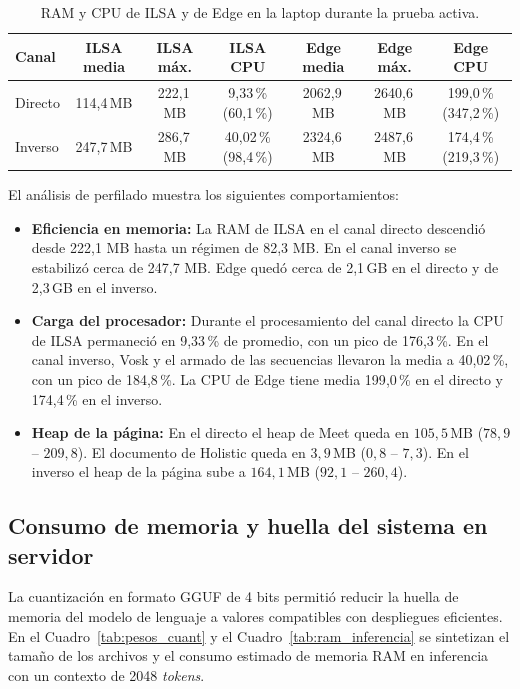 \begin{table}[H]
\centering
\footnotesize
\caption{RAM y CPU de ILSA y de Edge en la laptop durante la prueba activa.}
\label{tab:perfilado_recursos_log}
\setlength{\tabcolsep}{3pt}
\begin{tabular}{@{}lcccccc@{}}
\toprule
\textbf{Canal} & \textbf{ILSA media} & \textbf{ILSA máx.} & \textbf{ILSA CPU} & \textbf{Edge media} & \textbf{Edge máx.} & \textbf{Edge CPU} \\
\midrule
Directo & 114{,}4\,MB & 222{,}1\,MB & 9{,}33\,\% (60{,}1\,\%) & 2062{,}9\,MB & 2640{,}6\,MB & 199{,}0\,\% (347{,}2\,\%) \\
Inverso & 247{,}7\,MB & 286{,}7\,MB & 40{,}02\,\% (98{,}4\,\%) & 2324{,}6\,MB & 2487{,}6\,MB & 174{,}4\,\% (219{,}3\,\%) \\
\bottomrule
\end{tabular}
\end{table}

El análisis de perfilado muestra los siguientes comportamientos:
\begin{itemize}
\item \textbf{Eficiencia en memoria:} La RAM de ILSA en el canal directo descendió desde 222{,}1 MB hasta un régimen de 82{,}3 MB. En el canal inverso se estabilizó cerca de 247{,}7 MB. Edge quedó cerca de 2{,}1\,GB en el directo y de 2{,}3\,GB en el inverso.
\item \textbf{Carga del procesador:} Durante el procesamiento del canal directo la CPU de ILSA permaneció en 9{,}33\,\% de promedio, con un pico de 176{,}3\,\%. En el canal inverso, Vosk y el armado de las secuencias llevaron la media a 40{,}02\,\%, con un pico de 184{,}8\,\%. La CPU de Edge tiene media 199{,}0\,\% en el directo y 174{,}4\,\% en el inverso.
\item \textbf{Heap de la página:} En el directo el heap de Meet queda en $105{,}5$\,MB ($78{,}9$ -- $209{,}8$). El documento de Holistic queda en $3{,}9$\,MB ($0{,}8$ -- $7{,}3$). En el inverso el heap de la página sube a $164{,}1$\,MB ($92{,}1$ -- $260{,}4$).
\end{itemize}

\subsection{Consumo de memoria y huella del sistema en servidor}
\label{sec:memoria_inferencia}
La cuantización en formato GGUF de 4 bits permitió reducir la huella de memoria del modelo de lenguaje a valores compatibles con despliegues eficientes. En el Cuadro~\ref{tab:pesos_cuant} y el Cuadro~\ref{tab:ram_inferencia} se sintetizan el tamaño de los archivos y el consumo estimado de memoria RAM en inferencia con un contexto de 2048 \textit{tokens}.

